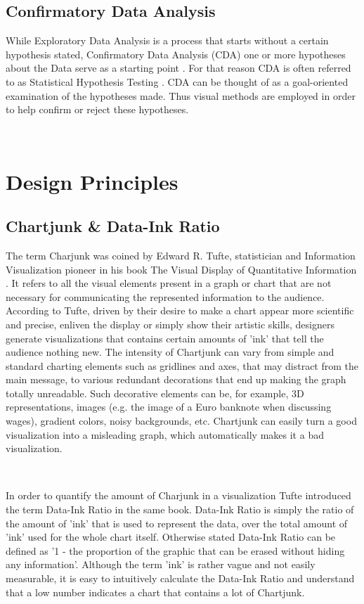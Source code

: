 \documentclass[16pt]{extreport}
\begin{document}
\subsection{Confirmatory Data Analysis} 
\parbox{\linewidth}{
\justify
\large{While Exploratory Data Analysis is a process that starts without a certain hypothesis stated, Confirmatory Data Analysis (CDA) one or more hypotheses about the Data serve as a starting point \cite{kaim}. For that reason CDA is often referred to as Statistical Hypothesis Testing \cite{cda1}. CDA can be thought of as a goal-oriented examination of the hypotheses made. Thus visual methods are employed in order to help confirm or reject these hypotheses.}}
\hfill \break\\

\section{Design Principles}

\subsection{Chartjunk \& Data-Ink Ratio}
\parbox{\linewidth}{
\justify
\large{The term Charjunk was coined by Edward R. Tufte, statistician and Information Visualization pioneer in his book The Visual Display of Quantitative Information \cite{tufte1}. It refers to all the visual elements present in a graph or chart that are not necessary for communicating the represented information to the audience. According to Tufte, driven by their desire to make a chart appear more scientific and precise, enliven the display or simply show their artistic skills, designers generate visualizations that contains certain amounts of 'ink' that tell the audience nothing new. The intensity of Chartjunk can vary from simple and standard charting elements such as gridlines and axes, that may distract from the main message, to various redundant decorations that end up making the graph totally unreadable. Such decorative elements can be, for example, 3D representations, images (e.g. the image of a Euro banknote when discussing wages), gradient colors, noisy backgrounds, etc. Chartjunk can easily turn a good visualization into a misleading graph, which automatically makes it a bad visualization.}}
\hfill \break\\
\parbox{\linewidth}{
\justify
\large{
In order to quantify the amount of Charjunk in a visualization Tufte introduced the term Data-Ink Ratio in the same book. Data-Ink Ratio is simply the ratio of the amount of 'ink' that is used to represent the data, over the total amount of 'ink' used for the whole chart itself. Otherwise stated Data-Ink Ratio can be defined as '1 - the proportion of the graphic that can be erased without hiding any information'. Although the term 'ink' is rather vague and not easily measurable, it is easy to intuitively calculate the Data-Ink Ratio and understand that a low number indicates a chart that contains a lot of Chartjunk.}}
\hfill \break\\
\end{document}
